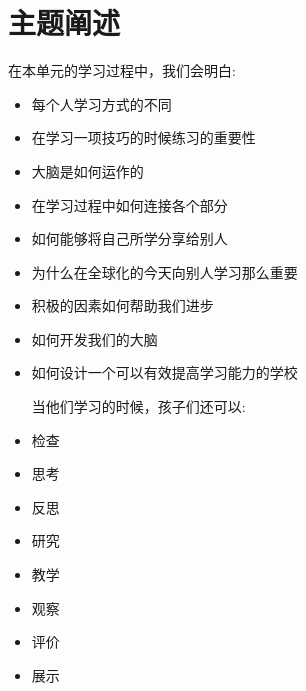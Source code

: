 \chapter{主题阐述}
   在本单元的学习过程中，我们会明白: \par

   \begin{itemize}
     \item 每个人学习方式的不同
     \item 在学习一项技巧的时候练习的重要性
     \item 大脑是如何运作的 
     \item 在学习过程中如何连接各个部分 
     \item 如何能够将自己所学分享给别人
     \item 为什么在全球化的今天向别人学习那么重要
     \item 积极的因素如何帮助我们进步  
     \item 如何开发我们的大脑
     \item 如何设计一个可以有效提高学习能力的学校
       \par
    当他们学习的时候，孩子们还可以: \par
     \item  检查
     \item  思考
     \item  反思
     \item  研究
     \item  教学
     \item  观察
     \item  评价
     \item  展示
   \end{itemize}
   
